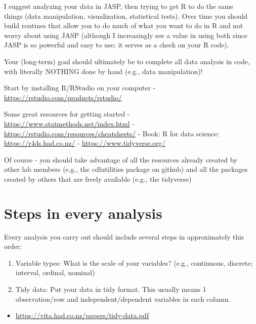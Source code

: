 \documentclass[
]{book}
\providecommand{\tightlist}{%
  \setlength{\itemsep}{0pt}\setlength{\parskip}{0pt}}
\begin{document}
I suggest analyzing your data in JASP, then trying to get R to do the same things (data manipulation, visualization, statistical tests). Over time you should build routines that allow you to do much of what you want to do in R and not worry about using JASP (although I increasingly see a value in using both since JASP is so powerful and easy to use; it serves as a check on your R code).

Your (long-term) goal should ultimately be to complete all data analysis in code, with literally NOTHING done by hand (e.g., data manipulation)!

Start by installing R/RStudio on your computer
- \url{https://rstudio.com/products/rstudio/}

Some great resources for getting started
- \url{https://www.statmethods.net/index.html}
- \url{https://rstudio.com/resources/cheatsheets/}
- Book: R for data science: \url{https://r4ds.had.co.nz/}
- \url{https://www.tidyverse.org/}

Of course - you should take advantage of all the resources already created by other lab members (e.g., the cdlutilities package on github) and all the packages created by others that are freely available (e.g., the tidyverse)

\hypertarget{steps-in-every-analysis}{%
\section{Steps in every analysis}\label{steps-in-every-analysis}}

Every analysis you carry out should include several steps in approximately this order:

\begin{enumerate}
\def\labelenumi{\arabic{enumi})}
\tightlist
\item
  Variable types: What is the scale of your variables? (e.g., continuous, discrete; interval, ordinal, nominal)
\item
  Tidy data: Put your data in tidy format. This usually means 1 observation/row and independent/dependent variables in each column.
\end{enumerate}

\begin{itemize}
\tightlist
\item
  \url{https://vita.had.co.nz/papers/tidy-data.pdf}
\end{itemize}
\end{document}
